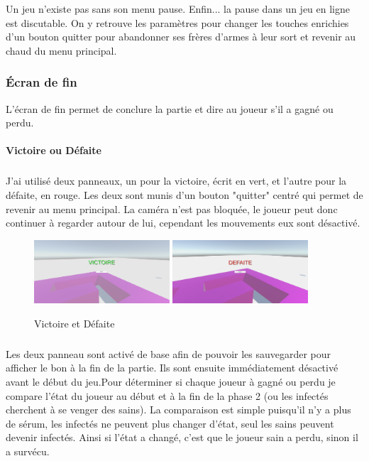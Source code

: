 \documentclass{article}
\begin{document}
Un jeu n'existe pas sans son menu pause. Enfin... la pause dans un jeu en ligne est discutable.
On y retrouve les paramètres pour changer les touches enrichies d'un bouton quitter pour abandonner ses frères d'armes à leur sort et revenir au chaud du menu principal.

\newpage
\subsubsection{Écran de fin}

L'écran de fin permet de conclure la partie et dire au joueur s'il a gagné ou perdu.

\paragraph{Victoire ou Défaite}
\subparagraph{}
J'ai utilisé deux panneaux, un pour la victoire, écrit en vert, et l'autre pour la défaite, en rouge.
Les deux sont munis d'un bouton "quitter" centré qui permet de revenir au menu principal.
La caméra n'est pas bloquée, le joueur peut donc continuer à regarder autour de lui, cependant les mouvements eux sont désactivé.

\par\vspace{0.5cm}
\begin{figure}[!h]
    \centering
    \includegraphics[width=0.45\textwidth]{Victoire.PNG}
    \includegraphics[width=0.45\textwidth]{Defaite.PNG}
    \caption{Victoire et Défaite}
    \label{Ecran de fin}
\end{figure}{}

\subparagraph{}
Les deux panneau sont activé de base afin de pouvoir les sauvegarder pour afficher le bon à la fin de la partie. Ils sont ensuite immédiatement désactivé avant le début du jeu.Pour déterminer si chaque joueur à gagné ou perdu je compare l'état du joueur au début et à la fin de la phase 2 (ou les infectés cherchent à se venger des sains). La comparaison est simple puisqu'il n'y a plus de sérum, les infectés ne peuvent plus changer d'état, seul les sains peuvent devenir infectés. Ainsi si l'état a changé, c'est que le joueur sain a perdu, sinon il a survécu.
\end{document}
